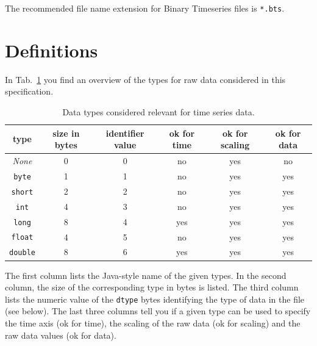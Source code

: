 \documentclass[a4paper,10pt]{article}
\begin{document}
The recommended file name extension for Binary Timeseries files is \texttt{*.bts}.

\section{Definitions}\label{sec:definitions}
In Tab.~\ref{tab:data types} you find an overview of the types for raw data considered in this specification.
\begin{table}[htbp]
 \centering
 \begin{tabular}{|c|c|c|c|c|c|}
    \hline
    type            & size in bytes & identifier value & ok for time & ok for scaling & ok for data \\
    \hline
    \textit{None}   & 0             & 0                & no          & yes            & no          \\
    \hline                                                                            
    \texttt{byte}   & 1             & 1                & no          & yes            & yes         \\
    \hline                                                                            
    \texttt{short}  & 2             & 2                & no          & yes            & yes         \\
    \hline                                                                            
    \texttt{int}    & 4             & 3                & no          & yes            & yes         \\
    \hline                                                                            
    \texttt{long}   & 8             & 4                & yes         & yes            & yes         \\
    \hline                                                                            
    \texttt{float}  & 4             & 5                & no          & yes            & yes         \\
    \hline                                                                            
    \texttt{double} & 8             & 6                & yes         & yes            & yes         \\
    \hline
 \end{tabular}
 \caption{Data types considered relevant for time series data.}
 \label{tab:data types}
\end{table}

The first column lists the Java-style name of the given types.
In the second column, the size of the corresponding type in bytes is listed.
The third column lists the numeric value of the \texttt{dtype} bytes identifying the type of data in the file (see below).
The last three columns tell you if a given type can be used to specify the time axis (ok for time),
the scaling of the raw data (ok for scaling) and the raw data values (ok for data).
\end{document}
